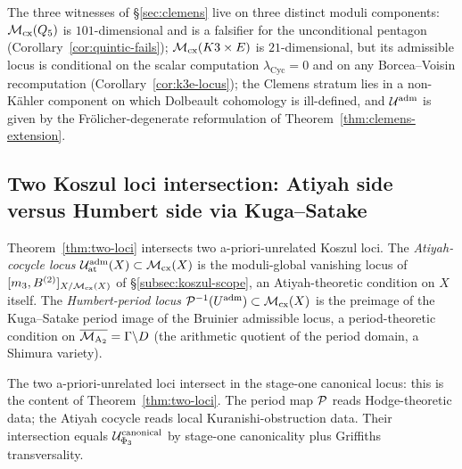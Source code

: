 The three witnesses of §\ref{sec:clemens} live on three distinct moduli components: $\mathcal{M}_{\mathrm{cx}}(Q_5)$ is $101$-dimensional and is a falsifier for the unconditional pentagon (Corollary~\ref{cor:quintic-fails}); $\mathcal{M}_{\mathrm{cx}}(K3 \times E)$ is $21$-dimensional, but its admissible locus is conditional on the scalar computation $\lambda_{\mathrm{Cyc}}=0$ and on any Borcea--Voisin recomputation (Corollary~\ref{cor:k3e-locus}); the Clemens stratum lies in a non-K\"ahler component on which Dolbeault cohomology is ill-defined, and $\mathcal{U}^{\mathrm{adm}}$ is given by the Fr\"olicher-degenerate reformulation of Theorem~\ref{thm:clemens-extension}.

\subsection{Two Koszul loci intersection: Atiyah side versus Humbert side via Kuga--Satake}
\label{subsec:two-loci-kuga-satake}

Theorem~\ref{thm:two-loci} intersects two a-priori-unrelated Koszul loci. The \emph{Atiyah-cocycle locus} $\mathcal{U}^{\mathrm{adm}}_{\mathrm{at}}(X) \subset \mathcal{M}_{\mathrm{cx}}(X)$ is the moduli-global vanishing locus of $[m_3, B^{(2)}]_{X/\mathcal{M}_{\mathrm{cx}}(X)}$ of §\ref{subsec:koszul-scope}, an Atiyah-theoretic condition on $X$ itself. The \emph{Humbert-period locus} $\mathcal{P}^{-1}(U^{\mathrm{adm}}) \subset \mathcal{M}_{\mathrm{cx}}(X)$ is the preimage of the Kuga--Satake period image of the Bruinier admissible locus, a period-theoretic condition on $\overline{\mathcal{M}_{\mathrm{A_2}}} = \Gamma \backslash D$ (the arithmetic quotient of the period domain, a Shimura variety).

The two a-priori-unrelated loci intersect in the stage-one canonical locus: this is the content of Theorem~\ref{thm:two-loci}. The period map $\mathcal{P}$ reads Hodge-theoretic data; the Atiyah cocycle reads local Kuranishi-obstruction data. Their intersection equals $\mathcal{U}^{\mathrm{canonical}}_{\Phi_3}$ by stage-one canonicality plus Griffiths transversality.

